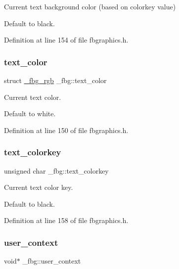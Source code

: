 Current text background color (based on colorkey value) 

Default to black. 

Definition at line 154 of file fbgraphics.\+h.

\mbox{\label{struct__fbg_a4abb858439598b09790ec6d5d8326bb2}} 
\subsubsection{\texorpdfstring{text\+\_\+color}{text\_color}}
{\footnotesize\ttfamily struct \mbox{\hyperlink{fbgraphics_8h_struct__fbg__rgb}{\+\_\+fbg\+\_\+rgb}} \+\_\+fbg\+::text\+\_\+color}



Current text color. 

Default to white. 

Definition at line 150 of file fbgraphics.\+h.

\mbox{\label{struct__fbg_a06e65293cf0b48e70d76d63f5de453e6}} 
\subsubsection{\texorpdfstring{text\+\_\+colorkey}{text\_colorkey}}
{\footnotesize\ttfamily unsigned char \+\_\+fbg\+::text\+\_\+colorkey}



Current text color key. 

Default to black. 

Definition at line 158 of file fbgraphics.\+h.

\mbox{\label{struct__fbg_ae3ecac18abee9dedabacaca9bb063bde}} 
\subsubsection{\texorpdfstring{user\+\_\+context}{user\_context}}
{\footnotesize\ttfamily void$\ast$ \+\_\+fbg\+::user\+\_\+context}



